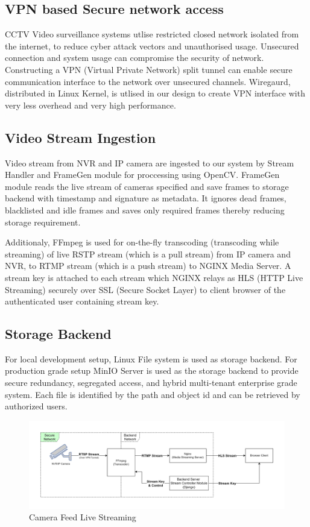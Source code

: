 \subsection{VPN based Secure network access}
CCTV Video surveillance systems utlise restricted closed network isolated from the internet, to reduce cyber attack vectors and unauthorised usage. Unsecured connection and system usage can compromise the security of network. 
Constructing a VPN (Virtual Private Network) split tunnel can enable secure communication interface to the network over unsecured channels. Wiregaurd, distributed in Linux Kernel, is utlised in our design to create VPN interface with very less overhead and very high performance.

\subsection{Video Stream Ingestion}
Video stream from NVR and IP camera are ingested to our system by Stream Handler and FrameGen module for proccessing using OpenCV. FrameGen module reads the live stream of cameras specified and save frames to storage backend with timestamp and signature as metadata. It ignores dead frames, blacklisted and idle frames and saves only required frames thereby reducing storage requirement.

Additionaly, FFmpeg is used for on-the-fly transcoding (transcoding while streaming) of live RSTP stream (which is a pull stream) from IP camera and NVR, to RTMP stream (which is a push stream) to NGINX Media Server. A stream key is attached to each stream which NGINX relays as HLS (HTTP Live Streaming) securely over SSL (Secure Socket Layer) to client browser of the authenticated user containing stream key.   

\subsection{Storage Backend}
For local development setup, Linux File system is used as storage backend. For production grade setup MinIO Server is used as the storage backend to provide secure redundancy, segregated access, and hybrid multi-tenant enterprise grade system. Each file is identified by the path and object id and can be retrieved by authorized users. 


\begin{figure}
	\centering
	\includegraphics[width=0.8\linewidth]{Images/live_stream_arch}
	\caption{Camera Feed Live Streaming}
	\label{fig:livestreamarch}
\end{figure}

